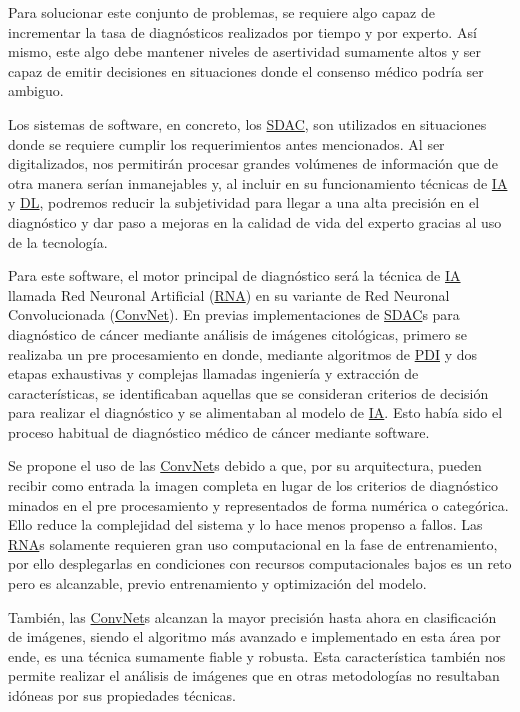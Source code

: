 Para solucionar este conjunto de problemas, se requiere algo capaz de
incrementar la tasa de diagnósticos realizados por tiempo y por experto. Así
mismo, este algo debe mantener niveles de asertividad sumamente altos y ser
capaz de emitir decisiones en situaciones donde el consenso médico podría ser
ambiguo.~\cite{Meza-Palacios2017}

Los sistemas de software, en concreto, los \hyperlink{abbr}{SDAC}, son
utilizados en situaciones donde se requiere cumplir los requerimientos antes
mencionados. Al ser digitalizados, nos permitirán procesar grandes volúmenes de
información que de otra manera serían inmanejables y, al incluir en su
funcionamiento técnicas de \hyperlink{abbr}{IA} y \hyperlink{abbr}{DL}, podremos
reducir la subjetividad para llegar a una alta precisión en el diagnóstico y dar
paso a mejoras en la calidad de vida del experto gracias al uso de la
tecnología.~\cite{DominguezHernandez2013} 

Para este software, el motor principal de diagnóstico será la técnica de
\hyperlink{abbr}{IA} llamada Red Neuronal Artificial
(\hyperlink{abbr}{RNA}) en su
variante de Red Neuronal Convolucionada
(\hyperlink{abbr}{ConvNet}).
En previas implementaciones de \hyperlink{abbr}{SDAC}s para diagnóstico de
cáncer mediante análisis de imágenes citológicas, primero se realizaba un pre
procesamiento en donde, mediante algoritmos de \hyperlink{abbr}{PDI} y dos
etapas exhaustivas y complejas llamadas ingeniería y extracción de
características, se identificaban aquellas que se consideran criterios de
decisión para realizar el diagnóstico y se alimentaban al modelo de
\hyperlink{abbr}{IA}. Esto había sido el proceso habitual de diagnóstico médico
de cáncer mediante software.~\cite{Ashok2016} 

Se propone el uso de las \hyperlink{abbr}{ConvNet}s debido a que, por su
arquitectura, pueden recibir como entrada la imagen completa en lugar de los
criterios de diagnóstico minados en el pre procesamiento y representados de
forma numérica o categórica. Ello reduce la complejidad del sistema y lo hace
menos propenso a fallos. Las \hyperlink{abbr}{RNA}s solamente requieren gran uso
computacional en la fase de entrenamiento, por ello desplegarlas en condiciones
con recursos computacionales bajos es un reto pero es alcanzable, previo
entrenamiento y optimización del modelo.~\cite{Lee2017} 

También, las \hyperlink{abbr}{ConvNet}s alcanzan la mayor precisión hasta ahora
en clasificación de imágenes, siendo el algoritmo más avanzado e implementado en
esta área por ende, es una técnica sumamente fiable y robusta. Esta
característica también nos permite realizar el análisis de imágenes que en otras
metodologías no resultaban idóneas por sus propiedades
técnicas.~\cite{Litjens2017}

